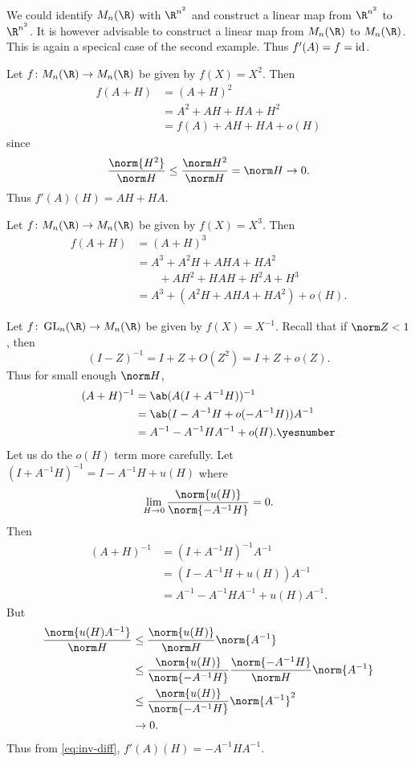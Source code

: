 \begin{examples}
    We could identify $M_n(\R)$ with $\R^{n^2}$ and construct
    a linear map from $\R^{n^2}$ to $\R^{n^2}$.
    It is however advisable to construct a linear map from $M_n(\R)$ to
    $M_n(\R)$.
    This is again a specical case of the second example.
    Thus $f'(A) = f = \operatorname{id}$.
    \item Let $f\colon M_n(\R) \to M_n(\R)$ be given by $f(X) = X^2$.
    Then \begin{align*}
        f(A + H) &= (A + H)^2 \\
            &= A^2 + AH + HA + H^2 \\
            &= f(A) + AH + HA + o(H)
    \end{align*} since \[
        \frac{\norm{H^2}}{\norm H} \le \frac{\norm H^2}{\norm H}
            = \norm H \to 0.
    \]
    Thus $f'(A)(H) = AH + HA$.
    \item Let $f\colon M_n(\R) \to M_n(\R)$ be given by $f(X) = X^3$.
    Then \begin{align*}
        f(A + H) &= (A + H)^3 \\
            &= A^3 + A^2 H + A H A + H A^2 \\
            &\qquad+ A H^2 + H A H + H^2 A + H^3 \\
            &= A^3 + (A^2 H + A H A + H A^2) + o(H).
    \end{align*}
    \item Let $f\colon \GL_n(\R) \to M_n(\R)$ be given by $f(X) = X^{-1}$.
    Recall that if $\norm Z < 1$, then \[
        (I - Z)^{-1} = I + Z + O(Z^2) = I + Z + o(Z).
    \] Thus for small enough $\norm H$, \begin{align*}
        (A + H)^{-1} &= \ab(A(I + A^{-1}H))^{-1} \\
            &= \ab(I - A^{-1}H + o(-A^{-1}H)) A^{-1} \\
            &= A^{-1} - A^{-1}HA^{-1} + o(H). \yesnumber \label{eq:inv-diff}
    \end{align*}
    Let us do the $o(H)$ term more carefully.
    Let $(I + A^{-1}H)^{-1} = I - A^{-1}H + u(H)$ where \[
        \lim_{H \to 0} \frac{\norm{u(H)}}{\norm {-A^{-1}H}} = 0.
    \] Then
    \begin{align*}
        (A + H)^{-1} &= (I + A^{-1}H)^{-1} A^{-1} \\
            &= (I - A^{-1}H + u(H)) A^{-1} \\
            &= A^{-1} - A^{-1}HA^{-1} + u(H)A^{-1}.
    \end{align*}
    But \begin{align*}
        \frac{\norm{u(H) A^{-1}}}{\norm H}
            &\le \frac{\norm{u(H)}}{\norm H} \norm{A^{-1}} \\
            &\le \frac{\norm{u(H)}}{\norm{-A^{-1}H}}
                \frac{\norm {-A^{-1}H}}{\norm H} \norm{A^{-1}} \\
            &\le \frac{\norm{u(H)}}{\norm{-A^{-1}H}} \norm{A^{-1}}^2 \\
            &\to 0.
    \end{align*}
    Thus from \cref{eq:inv-diff}, $f'(A)(H) = -A^{-1}HA^{-1}$.


\end{examples}
